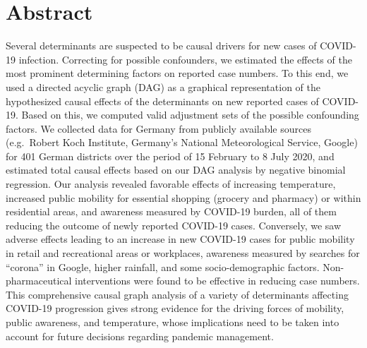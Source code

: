 \documentclass[10pt,letterpaper]{article}
\begin{document}
\section*{Abstract}
Several determinants are suspected to be causal drivers for new cases of COVID-19 infection. Correcting for possible confounders, we estimated the effects of the most prominent determining factors on reported case numbers. To this end, we used a directed acyclic graph (DAG) as a graphical representation of the hypothesized causal effects of the determinants on new reported cases of COVID-19. Based on this, we computed valid adjustment sets of the possible confounding factors. We collected data for Germany from publicly available sources (e.g.~Robert Koch Institute, Germany's National Meteorological Service, Google) for 401 German districts over the period of 15 February to 8 July 2020, and estimated total causal effects based on our DAG analysis by negative binomial regression. Our analysis revealed favorable effects of increasing temperature, increased public mobility for essential shopping (grocery and pharmacy) or within residential areas, and awareness measured by COVID-19 burden, all of them reducing the outcome of newly reported COVID-19 cases. Conversely, we saw adverse effects leading to an increase in new COVID-19 cases for public mobility in retail and recreational areas or workplaces, awareness measured by searches for ``corona'' in Google, higher rainfall, and some socio-demographic factors. Non-pharmaceutical interventions were found to be effective in reducing case numbers. This comprehensive causal graph analysis of a variety of determinants affecting COVID-19 progression gives strong evidence for the driving forces of mobility, public awareness, and temperature, whose implications need to be taken into account for future decisions regarding pandemic management.

\end{document}
